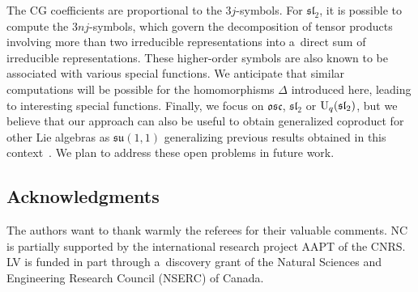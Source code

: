 \documentclass[10pt,a4paper]{amsart}
\numberwithin{equation}{section}
\theoremstyle{definition}
\begin{document}
The CG coefficients are proportional to the $3j$-symbols. For $\mathfrak{sl}_2$, it is possible to compute the $3nj$-symbols, which govern the decomposition of tensor products involving more than two irreducible representations into a~direct sum of irreducible representations. These higher-order symbols are also known to be associated with various special functions. We anticipate that similar computations will be possible for the homomorphisms $\Delta$ introduced here, leading to interesting special functions.
Finally, we focus on $\mathfrak{osc}$, $\mathfrak{sl}_2$ or ${\rm U}_q(\mathfrak{sl}_2)$, but we believe that our approach can also be useful to obtain generalized coproduct for other Lie algebras as $\mathfrak{su}(1,1)$ generalizing previous results obtained in this context~\cite{Alvarez}.
We plan to address these open problems in future work.

\subsection*{Acknowledgments} The authors want to thank warmly the referees for their valuable comments.
NC is partially supported by the international research project AAPT of the CNRS.
 LV is funded in part through a~discovery grant of the Natural Sciences and Engineering Research Council (NSERC) of Canada.

\end{document}
